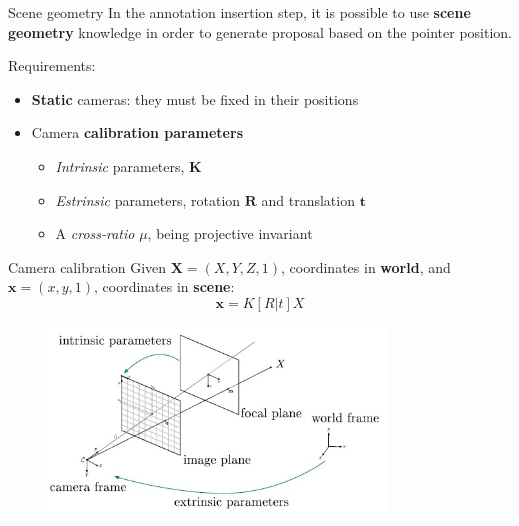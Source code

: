 \documentclass{beamer}
\begin{document}
\begin{tframe}{Scene geometry}
In the annotation insertion step, it is possible to use\textbf{ scene geometry} knowledge in order to generate proposal based on the pointer position.

\vspace{0.5cm}
Requirements:
\vspace{0.3cm}
\begin{itemize}
\item \textbf{Static} cameras: they must be fixed in their positions
\vspace{0.2cm}
\item Camera \textbf{calibration parameters}
\vspace{0.2cm}
\begin{itemize}
\item \emph{Intrinsic} parameters, $\textbf{K}$
\item \emph{Estrinsic} parameters, rotation $\textbf{R}$ and translation $\textbf{t}$
\item A \emph{cross-ratio} \textbf{$\mu$}, being projective invariant
\end{itemize}
\end{itemize}
\end{tframe}

\begin{tframe}{Camera calibration}
Given $\textbf{X} = (X, Y, Z, 1)$, coordinates in \textbf{world}, and $\textbf{x} = (x, y, 1)$, coordinates in \textbf{scene}:
$$\textbf{x} = K [R | t] X$$
\begin{figure}[h]
\centering
\includegraphics[width=0.8\textwidth]{images/camera.jpg}
\end{figure}
\end{tframe}
\end{document}
